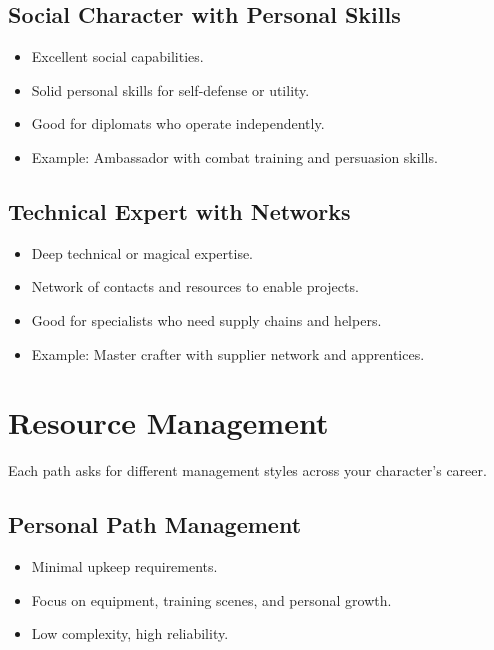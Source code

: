 \subsection*{Social Character with Personal Skills}
\begin{itemize}
\item Excellent social capabilities.
\item Solid personal skills for self-defense or utility.
\item Good for diplomats who operate independently.
\item Example: Ambassador with combat training and persuasion skills.
\end{itemize}

\subsection*{Technical Expert with Networks}
\begin{itemize}
\item Deep technical or magical expertise.
\item Network of contacts and resources to enable projects.
\item Good for specialists who need supply chains and helpers.
\item Example: Master crafter with supplier network and apprentices.
\end{itemize}


\section{Resource Management}
\label{sec:xp-resource-mgmt}

Each path asks for different management styles across your character's career.

\subsection*{Personal Path Management}
\begin{itemize}
\item Minimal upkeep requirements.
\item Focus on equipment, training scenes, and personal growth.
\item Low complexity, high reliability.
\end{itemize}

